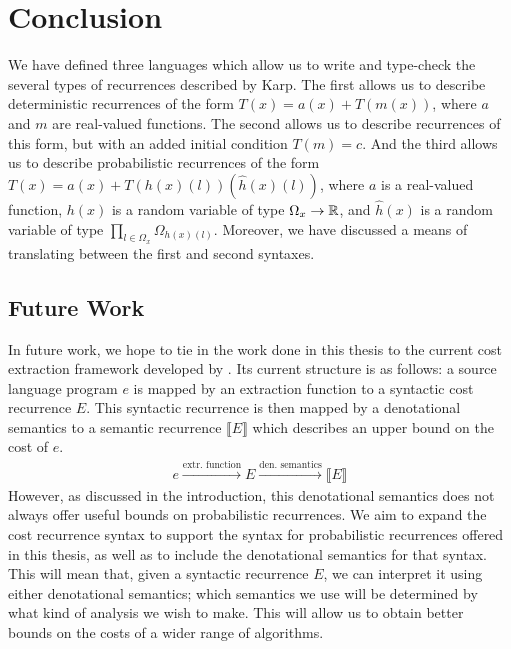 \chapter{Conclusion}

We have defined three languages which allow us to write and type-check the several types of recurrences
described by Karp. The first allows us to describe deterministic recurrences of the form $T(x) = a(x) + T(m(x))$, where $a$ and $m$ are real-valued functions. The second allows us to describe recurrences of this form, but with an added initial 
condition $T(m) = c$. And the third allows us to describe probabilistic recurrences of the form 
$T(x) = a(x) + T(h(x)(l))(\hat{h}(x)(l))$, where $a$ is a real-valued function, $h(x)$ is a random variable of type
$\Omega_x \rightarrow \mathbb{R}$, and $\hat{h}(x)$ is a random variable of type
 $\prod_{l \in \Omega_x} \Omega_{h(x)(l)}$. Moreover, we have discussed a means of translating between
 the first and second syntaxes. 
 
 \section{Future Work}
 In future work, we hope to tie in the work done in this thesis to the current cost extraction framework developed
 by \cite{N.-Danner:2015aa}. Its current structure is as follows: a source language program $e$ is mapped by an 
 extraction function to a syntactic cost recurrence $E$. This syntactic recurrence is then mapped by a denotational
 semantics to a semantic recurrence $\llbracket E \rrbracket$ which describes an upper bound on the cost of $e$. 
 \begin{align*}
 e\xrightarrow{\text{extr. function}}E\xrightarrow{\text{den. semantics}}\llbracket E \rrbracket
 \end{align*}
 However, as discussed in the introduction, this denotational semantics does not always offer useful bounds on 
 probabilistic recurrences. We aim to expand the cost recurrence syntax to support the syntax for 
 probabilistic recurrences offered in this thesis, as well as to include the denotational semantics for that syntax.
 This will mean that, given a syntactic recurrence $E$, we can interpret it using either denotational semantics;
which semantics we use will be determined by what kind of analysis we wish to make. This will allow us to obtain 
better bounds on the costs of a wider range of algorithms.
